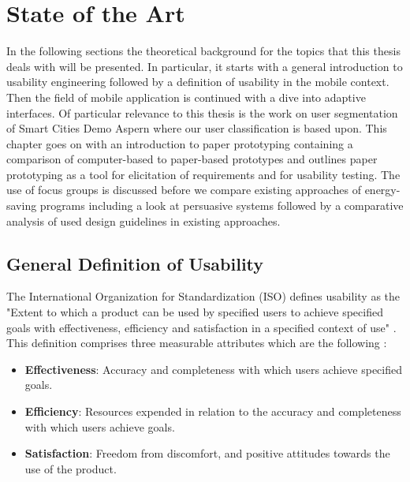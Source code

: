 \chapter{State of the Art}

In the following sections the theoretical background for the topics that this thesis deals with will be presented. In particular, it starts with a general introduction to usability engineering followed by a definition of usability in the mobile context. Then the field of mobile application is continued with a dive into adaptive interfaces. Of particular relevance to this thesis is the work on user segmentation of Smart Cities Demo Aspern where our user classification is based upon. This chapter goes on with an introduction to paper prototyping containing a comparison of computer-based to paper-based prototypes and outlines paper prototyping as a tool for elicitation of requirements and for usability testing. The use of focus groups is discussed before we compare existing approaches of energy-saving programs including a look at persuasive systems followed by a comparative analysis of used design guidelines in existing approaches.

\section{General Definition of Usability}

The International Organization for Standardization (ISO) defines usability as the "Extent to which a product can be used by specified users to achieve specified goals with effectiveness, efficiency and satisfaction in a specified context of use" \cite{bevan1998iso}. This definition comprises three measurable attributes which are the following \cite{din19989241}:

\begin{itemize}
	\item \textbf{Effectiveness}: Accuracy and completeness with which users achieve specified goals.
	\item \textbf{Efficiency}: Resources expended in relation to the accuracy and completeness with which users achieve goals.	
	\item \textbf{Satisfaction}: Freedom from discomfort, and positive attitudes towards the use of the product.
\end{itemize}

